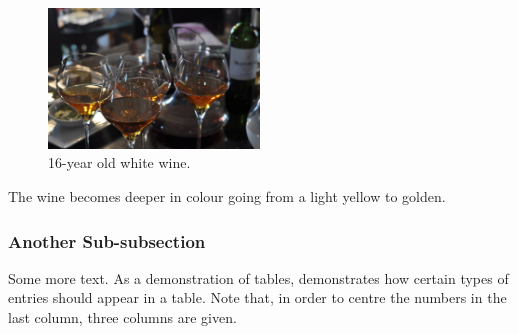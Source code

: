 \documentclass{wkrpt}
\begin{document}
\begin{figure}[ht!] %
    \centering \includegraphics[width=0.5\textwidth]{assets/wine}
    \caption{16-year old white wine.}
    \label{fig:wine}
\end{figure}

The wine becomes deeper in colour going from a light yellow to golden.
\subsubsection{Another Sub-subsection}

Some more text.  As a demonstration of tables,  demonstrates how certain types of entries should appear in a table.  Note that, in order to centre the numbers in the last column, three columns are given.
\end{document}
